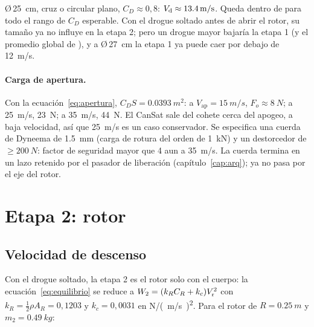 \begin{resultado}
Ø\,\SI{25}{cm}, cruz o circular plano, $C_D\approx0{,}8$: $V_{\mathrm{d}}\approx\SI{13.4}{m/s}$.
Queda dentro de  para todo el rango de $C_D$ esperable. Con el drogue soltado
antes de abrir el rotor, su tamaño ya no influye en la etapa 2; pero un drogue mayor
bajaría la etapa 1 (y el promedio global de ), y a Ø\,\SI{27}{cm} la etapa 1 ya
puede caer por debajo de \SI{12}{m/s}.
\end{resultado}

\paragraph{Carga de apertura.} Con la ecuación~\eqref{eq:apertura}, $C_D S=\SI{0.0393}{m^2}$:
a $V_{\text{ap}}=\SI{15}{m/s}$, $F_o\approx\SI{8}{N}$; a \SI{25}{m/s}, \SI{23}{N}; a
\SI{35}{m/s}, \SI{44}{N}. El CanSat sale del cohete cerca del apogeo, a baja velocidad, así
que \SI{25}{m/s} es un caso conservador. Se especifica una cuerda de Dyneema de
\SI{1.5}{mm} (carga de rotura del orden de \SI{1}{kN}) y un destorcedor de
$\ge\SI{200}{N}$: factor de seguridad mayor que 4 aun a \SI{35}{m/s}. La cuerda termina en
un lazo retenido por el pasador de liberación (capítulo~\ref{cap:arq}); ya no pasa por el
eje del rotor.

\section{Etapa 2: rotor}\label{sec:dim-rotor}

\subsection{Velocidad de descenso}
Con el drogue soltado, la etapa 2 es el rotor solo con el cuerpo: la
ecuación~\eqref{eq:equilibrio} se reduce a $W_2=(k_RC_{R}+k_c)V_{\mathrm{r}}^2$ con
$k_R=\tfrac12\rho A_R=0{,}1203$ y $k_c=0{,}0031$ en \si{N/(m/s)^2}. Para el rotor de
$R=\SI{0.25}{m}$ y $m_2=\SI{0.49}{kg}$:

